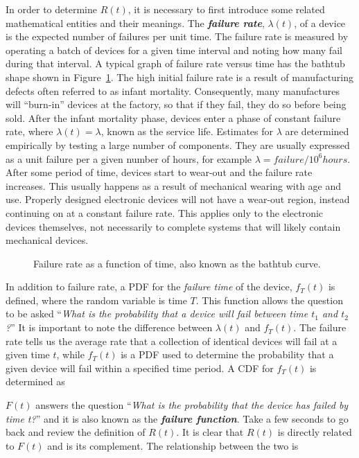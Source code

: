In order to determine $R(t)$, it is necessary to first introduce
some related mathematical entities and their meanings. The
\emph{\textbf{failure rate}}, $\lambda(t)$, of a device is the expected
number of failures per unit time. The failure rate is measured by
operating a batch of devices for a given time interval and noting how
many fail during that interval. A typical graph of failure rate versus
time has the bathtub shape shown in Figure~\ref{figure:bathtubFunction}. 
The high initial failure
rate is a result of manufacturing defects often referred to as infant
mortality. Consequently, many manufactures will ``burn-in'' devices at
the factory, so that if they fail, they do so before being sold. After
the infant mortality phase, devices enter a phase of constant failure
rate, where $\lambda(t) = \lambda$, known as the service life. Estimates for
$\lambda$ are determined empirically by testing a large number of
components. They are usually expressed as a unit failure per a given
number of hours, for example $\lambda  = failure/10^6 hours$.
After some period of time, devices start to wear-out and the failure
rate increases. This usually happens as a result of mechanical wearing
with age and use. Properly designed electronic devices will not have a
wear-out region, instead continuing on at a constant failure rate. This
applies only to the electronic devices themselves, not necessarily to
complete systems that will likely contain mechanical devices.

\begin{figure}
\caption{Failure rate as a function of time, also known as
the bathtub curve.}
\label{figure:bathtubFunction}
\end{figure}

In addition to failure rate, a PDF for the \emph{failure time} of the
device, $f_T(t)$ is defined, where the
random variable is time $T$. This function allows the question to
be asked ``\emph{What is the probability that a device will fail between
time $t_1$ and $t_2$?}'' It is important to
note the difference between $\lambda(t)$ and
$f_T(t)$. The failure rate tells us the
average rate that a collection of identical devices will fail at a given
time $t$, while $f_T(t)$ is a PDF
used to determine the probability that a given device will fail within a
specified time period. A CDF for $f_T(t)$
is determined as



$F(t)$ answers the question ``\emph{What is the probability that
the device has failed by time t?}'' and it is also known as the
\emph{\textbf{failure function}}. Take a few seconds to go back and
review the definition of $R(t)$. It is clear that $R(t)$ is
directly related to $F(t)$ and is its complement. The relationship
between the two is

